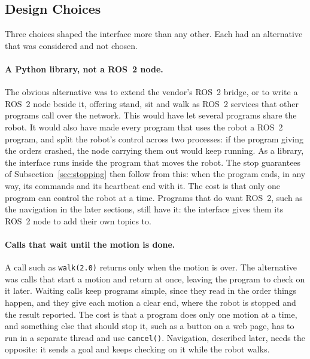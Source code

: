 \subsection{Design Choices}
\label{sec:choices}

Three choices shaped the interface more than any other. Each had an alternative that was considered and not
chosen.

\paragraph{A Python library, not a ROS~2 node.} The obvious alternative was to extend the vendor's ROS~2
bridge, or to write a ROS~2 node beside it, offering stand, sit and walk as ROS~2 services that other
programs call over the network. This would have let several programs share the robot. It would also have
made every program that uses the robot a ROS~2 program, and split the robot's control across two processes:
if the program giving the orders crashed, the node carrying them out would keep running. As a library, the
interface runs inside the program that moves the robot. The stop guarantees of Subsection~\ref{sec:stopping}
then follow from this: when the program ends, in any way, its commands and its heartbeat end with it. The
cost is that only one program can control the robot at a time. Programs that do want ROS~2, such as the
navigation in the later sections, still have it: the interface gives them its ROS~2 node to add their own
topics to.

\paragraph{Calls that wait until the motion is done.} A call such as \texttt{walk(2.0)} returns only when the
motion is over. The alternative was calls that start a motion and return at once, leaving the program to
check on it later. Waiting calls keep programs simple, since they read in the order things happen, and they
give each motion a clear end, where the robot is stopped and the result reported. The cost is that a program
does only one motion at a time, and something else that should stop it, such as a button on a web page, has to
run in a separate thread and use \texttt{cancel()}. Navigation, described later, needs the opposite: it sends
a goal and keeps checking on it while the robot walks.

